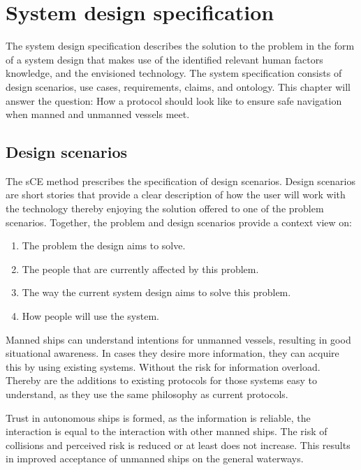 \chapter{System design specification}
\label{ch:system-design}
The system design specification describes the solution to the problem in the form of a system design that makes use of the identified relevant human factors knowledge, and the envisioned technology. The system specification consists of design scenarios, use cases, requirements, claims, and ontology. This chapter will answer the question: How a protocol should look like to ensure safe navigation when manned and unmanned vessels meet.

\section{Design scenarios}
The sCE method prescribes the specification of design scenarios. Design scenarios are short stories that provide a clear description of how the user will work with the technology thereby enjoying the solution offered to one of the problem scenarios. Together, the problem and design scenarios provide a context view on:
\begin{enumerate}
	\item The problem the design aims to solve.
	\item The people that are currently affected by this problem.
	\item The way the current system design aims to solve this problem.
	\item How people will use the system.
\end{enumerate}

Manned ships can understand intentions for unmanned vessels, resulting in good situational awareness. In cases they desire more information, they can acquire this by using existing systems. Without the risk for information overload. Thereby are the additions to existing protocols for those systems easy to understand, as they use the same philosophy as current protocols.

Trust in autonomous ships is formed, as the information is reliable, the interaction is equal to the interaction with other manned ships. The risk of collisions and perceived risk is reduced or at least does not increase. This results in improved acceptance of unmanned ships on the general waterways.
 
